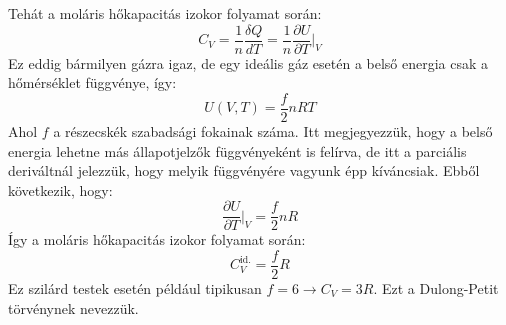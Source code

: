 \documentclass[../main.tex]{subfiles}
\begin{document}
Tehát a moláris hőkapacitás izokor folyamat során:
\begin{equation}
    C_V = \frac{1}{n} \frac{\delta Q}{dT} = \frac{1}{n} \frac{\partial U}{\partial T}\bigg|_{V}
\end{equation}
Ez eddig bármilyen gázra igaz, de egy ideális gáz esetén a belső energia csak a hőmérséklet függvénye, így:
\begin{equation}
    U(V, T) = \frac{f}{2} n R T
\end{equation}
Ahol $f$ a részecskék szabadsági fokainak száma. Itt megjegyezzük, hogy a belső energia lehetne más állapotjelzők függvényeként is felírva, de itt a parciális
deriváltnál jelezzük, hogy melyik függvényére vagyunk épp kíváncsiak. Ebből következik, hogy:
\begin{equation}
    \frac{\partial U}{\partial T}\bigg|_{V} = \frac{f}{2} n R
\end{equation}
Így a moláris hőkapacitás izokor folyamat során:
\begin{equation}
    C^{\text{id.}}_V = \frac{f}{2} R
\end{equation}
Ez szilárd testek esetén például tipikusan $f = 6 \to C_V = 3R$. Ezt a Dulong-Petit törvénynek nevezzük.
\end{document}
